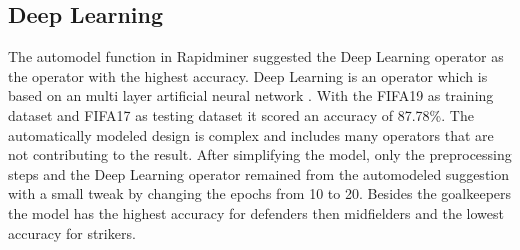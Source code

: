 \subsection{Deep Learning}

The automodel function in Rapidminer suggested the Deep Learning operator as the operator with the highest accuracy. Deep Learning is an operator which is based on an multi layer artificial neural network \cite{ref_rapidminerDeepLearning}. With the FIFA19 as training dataset and FIFA17 as testing dataset it scored an accuracy of 87.78\%. The automatically modeled design is complex and includes many operators that are not contributing to the result. After simplifying the model, only the preprocessing steps and the Deep Learning operator remained from the automodeled suggestion with a small tweak by changing the epochs from 10 to 20. %
Besides the goalkeepers the model has the highest accuracy for defenders then midfielders and the lowest accuracy for strikers.%

